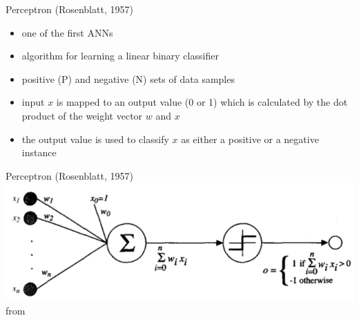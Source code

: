 \documentclass{beamer}
\begin{document}
\begin{frame}{Perceptron (Rosenblatt, 1957)}
\begin{itemize}
\item one of the first ANNs
\item algorithm for learning a linear binary classifier
\item positive (P) and negative (N) sets of data samples
\item input $x$ is mapped to an output value (0 or 1) which is calculated by the dot product of the weight vector $w$ and $x$
\item the output value is used to classify $x$ as either a positive or a negative instance
\end{itemize}
\end{frame}

\begin{frame}{Perceptron (Rosenblatt, 1957)}
\centering
\includegraphics[width=1\textwidth]{perceptron1}\\from \cite{mitchell1997a}
\end{frame}
\end{document}
